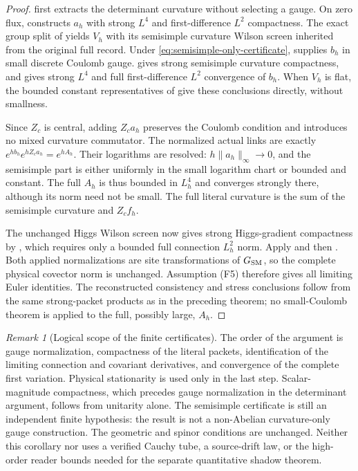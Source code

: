 \documentclass[11pt]{article}
\numberwithin{equation}{section}
\theoremstyle{definition}
\theoremstyle{remark}
\newtheorem{remark}[remark]{Remark}
\newcommand{\norm}[1]{\lVert#1\rVert}
\begin{document}
\begin{proof}
 first extracts the determinant curvature
without selecting a gauge.  On zero flux,
 constructs $a_h$ with strong
$L^4$ and first-difference $L^2$ compactness.  The exact group split of
 yields $V_h$ with its semisimple
curvature Wilson screen inherited from the original full record.  Under
\eqref{eq:semisimple-only-certificate},
 supplies $b_h$ in small discrete
Coulomb gauge.   gives strong
semisimple curvature compactness, and
 gives strong $L^4$ and full
first-difference $L^2$ convergence of $b_h$.  When $V_h$ is flat, the
bounded constant representatives of 
give these conclusions directly, without smallness.

Since $Z_c$ is central, adding $Z_ca_h$ preserves the Coulomb condition and
introduces no mixed curvature commutator.  The normalized actual links are
exactly $e^{h b_h}e^{hZ_ca_h}=e^{hA_h}$.  Their logarithms are resolved:
$h\norm{a_h}_\infty\to0$, and the semisimple part is either uniformly in
the small logarithm chart or bounded and constant.  The full $A_h$ is thus
bounded in $L_h^4$ and converges strongly there, although its norm need not
be small.  The full literal curvature is the sum of the semisimple
curvature and $Z_cf_h$.

The unchanged Higgs Wilson screen now gives strong Higgs-gradient
compactness by , which requires only a
bounded full connection $L_h^2$ norm.  Apply
 and then
.  Both applied normalizations are
site transformations of $G_{\rm SM}$, so the complete physical covector norm
is unchanged.  Assumption \textup{(F5)} therefore gives all limiting Euler
identities.  The reconstructed consistency and stress conclusions follow
from the same strong-packet products as in the preceding theorem; no
small-Coulomb theorem is applied to the full, possibly large, $A_h$.
\end{proof}

\begin{remark}[Logical scope of the finite certificates]
\label{rem:native-dependency-scope}
The order of the argument is gauge normalization, compactness of the
literal packets, identification of the limiting connection and covariant
derivatives, and convergence of the complete first variation.  Physical
stationarity is used only in the last step.  Scalar-magnitude compactness,
which precedes gauge normalization in the determinant argument, follows
from unitarity alone.  The semisimple certificate is still an independent
finite hypothesis: the result is not a non-Abelian curvature-only gauge
construction.  The geometric and spinor conditions are unchanged.
Neither this corollary nor  uses a
verified Cauchy tube, a source-drift law, or the high-order reader bounds
needed for the separate quantitative shadow theorem.
\end{remark}
\end{document}
